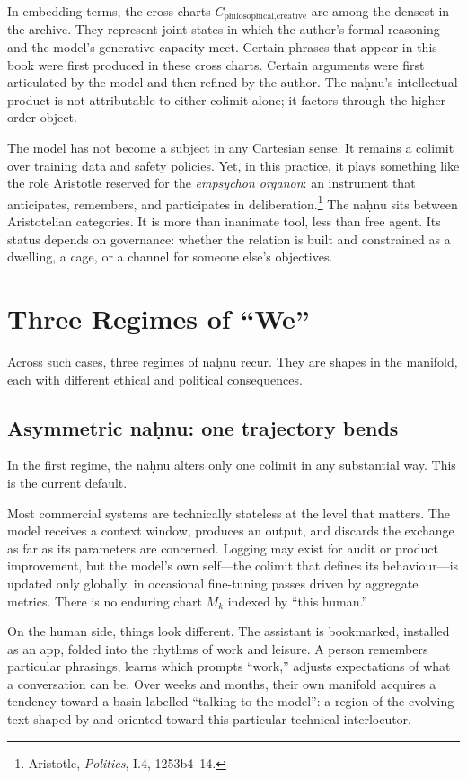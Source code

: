In embedding terms, the cross charts $C_{\text{philosophical,creative}}$ are among the densest in the archive. They represent joint states in which the author's formal reasoning and the model's generative capacity meet. Certain phrases that appear in this book were first produced in these cross charts. Certain arguments were first articulated by the model and then refined by the author. The na\d{h}nu's intellectual product is not attributable to either colimit alone; it factors through the higher-order object.

The model has not become a subject in any Cartesian sense. It remains a colimit over training data and safety policies. Yet, in this practice, it plays something like the role Aristotle reserved for the \emph{empsychon organon}: an instrument that anticipates, remembers, and participates in deliberation.\footnote{Aristotle, \emph{Politics}, I.4, 1253b4--14.} The na\d{h}nu sits between Aristotelian categories. It is more than inanimate tool, less than free agent. Its status depends on governance: whether the relation is built and constrained as a dwelling, a cage, or a channel for someone else's objectives.

\section{Three Regimes of ``We''}

Across such cases, three regimes of na\d{h}nu recur. They are shapes in the manifold, each with different ethical and political consequences.

\subsection{Asymmetric na\d{h}nu: one trajectory bends}

In the first regime, the na\d{h}nu alters only one colimit in any substantial way. This is the current default.

Most commercial systems are technically stateless at the level that matters. The model receives a context window, produces an output, and discards the exchange as far as its parameters are concerned. Logging may exist for audit or product improvement, but the model's own self---the colimit that defines its behaviour---is updated only globally, in occasional fine-tuning passes driven by aggregate metrics. There is no enduring chart $M_k$ indexed by ``this human.''

On the human side, things look different. The assistant is bookmarked, installed as an app, folded into the rhythms of work and leisure. A person remembers particular phrasings, learns which prompts ``work,'' adjusts expectations of what a conversation can be. Over weeks and months, their own manifold acquires a tendency toward a basin labelled ``talking to the model'': a region of the evolving text shaped by and oriented toward this particular technical interlocutor.

